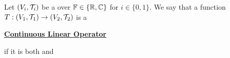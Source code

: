 \label{def:TVSContinuousLinearOperator}
\newcommand{\ContinuousLinearOperator}[0]{
    \bf \hyperref[def:TVSContinuousLinearOperator]{Continuous Linear Operator} \rm
}

\begin{df}
Let $(V_i,\mathcal{T}_i)$ be a 
\TVS over 
$\mathbb{F} \in \{\mathbb{R}, \mathbb{C}\}$ 
for 
$i \in \{0,1\}$. 
We say that a function 
$T:(V_1, \mathcal{T}_1) \to (V_2, \mathcal{T}_2)$ 
is a 
\ContinuousLinearOperator
if it is both 
\Linear
and 
\Continuous 
\end{df}